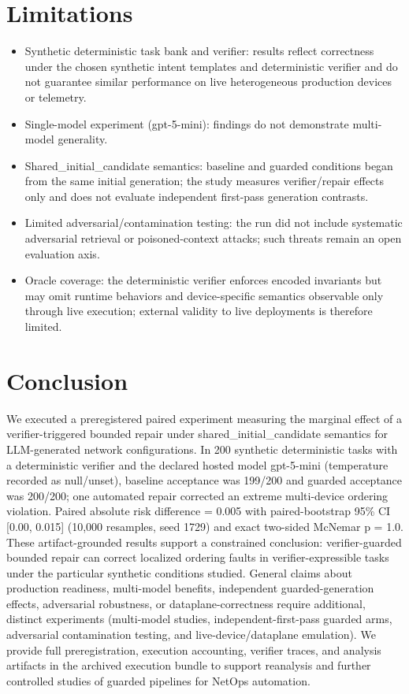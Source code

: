 \documentclass[conference]{IEEEtran}
\begin{document}
\section{Limitations}
\begin{itemize}
\item Synthetic deterministic task bank and verifier: results reflect correctness under the chosen synthetic intent templates and deterministic verifier and do not guarantee similar performance on live heterogeneous production devices or telemetry.
\item Single-model experiment (gpt-5-mini): findings do not demonstrate multi-model generality.
\item Shared\_initial\_candidate semantics: baseline and guarded conditions began from the same initial generation; the study measures verifier/repair effects only and does not evaluate independent first-pass generation contrasts.
\item Limited adversarial/contamination testing: the run did not include systematic adversarial retrieval or poisoned-context attacks; such threats remain an open evaluation axis.
\item Oracle coverage: the deterministic verifier enforces encoded invariants but may omit runtime behaviors and device-specific semantics observable only through live execution; external validity to live deployments is therefore limited.
\end{itemize}

\section{Conclusion}
We executed a preregistered paired experiment measuring the marginal effect of a verifier-triggered bounded repair under shared\_initial\_candidate semantics for LLM-generated network configurations. In 200 synthetic deterministic tasks with a deterministic verifier and the declared hosted model gpt-5-mini (temperature recorded as null/unset), baseline acceptance was 199/200 and guarded acceptance was 200/200; one automated repair corrected an extreme multi-device ordering violation. Paired absolute risk difference = 0.005 with paired-bootstrap 95\% CI [0.00, 0.015] (10,000 resamples, seed 1729) and exact two-sided McNemar p = 1.0. These artifact-grounded results support a constrained conclusion: verifier-guarded bounded repair can correct localized ordering faults in verifier-expressible tasks under the particular synthetic conditions studied. General claims about production readiness, multi-model benefits, independent guarded-generation effects, adversarial robustness, or dataplane-correctness require additional, distinct experiments (multi-model studies, independent-first-pass guarded arms, adversarial contamination testing, and live-device/dataplane emulation). We provide full preregistration, execution accounting, verifier traces, and analysis artifacts in the archived execution bundle to support reanalysis and further controlled studies of guarded pipelines for NetOps automation.
\end{document}
